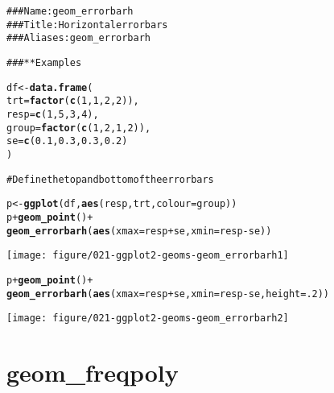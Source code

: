 \documentclass[a4paper,titlepage]{tufte-handout}\usepackage{graphicx, color}
\makeatletter
\def\maxwidth{ %
  \ifdim\Gin@nat@width>\linewidth
    \linewidth
  \else
    \Gin@nat@width
  \fi
}
\newcommand{\hlfunctioncall}[1]{\textcolor[rgb]{0.501960784313725,0,0.329411764705882}{\textbf{#1}}}%
\newcommand{\hlcomment}[1]{\textcolor[rgb]{0.180392156862745,0.6,0.341176470588235}{#1}}%
\newenvironment{kframe}{%
 \def\at@end@of@kframe{}%
 \ifinner\ifhmode%
  \def\at@end@of@kframe{\end{minipage}}%
  \begin{minipage}{\columnwidth}%
 \fi\fi%
 \def\FrameCommand##1{\hskip\@totalleftmargin \hskip-\fboxsep
 \colorbox{shadecolor}{##1}\hskip-\fboxsep
     \hskip-\linewidth \hskip-\@totalleftmargin \hskip\columnwidth}%
 \MakeFramed {\advance\hsize-\width
   \@totalleftmargin\z@ \linewidth\hsize
   \@setminipage}}%
 {\par\unskip\endMakeFramed%
 \at@end@of@kframe}
\newenvironment{knitrout}{}{} %
\makeatother
\begin{document}
\begin{knitrout}
\color{fgcolor}\begin{kframe}
\begin{alltt}
\hlcomment{### Name: geom_errorbarh}
\hlcomment{### Title: Horizontal error bars}
\hlcomment{### Aliases: geom_errorbarh}

\hlcomment{### ** Examples}

df <- \hlfunctioncall{data.frame}(
  trt = \hlfunctioncall{factor}(\hlfunctioncall{c}(1, 1, 2, 2)),
  resp = \hlfunctioncall{c}(1, 5, 3, 4),
  group = \hlfunctioncall{factor}(\hlfunctioncall{c}(1, 2, 1, 2)),
  se = \hlfunctioncall{c}(0.1, 0.3, 0.3, 0.2)
)

\hlcomment{# Define the top and bottom of the errorbars}

p <- \hlfunctioncall{ggplot}(df, \hlfunctioncall{aes}(resp, trt, colour = group))
p + \hlfunctioncall{geom_point}() +
  \hlfunctioncall{geom_errorbarh}(\hlfunctioncall{aes}(xmax = resp + se, xmin = resp - se))
\end{alltt}
\end{kframe}
\texttt{[image: figure/021-ggplot2-geoms-geom\_errorbarh1]} 
\begin{kframe}\begin{alltt}
p + \hlfunctioncall{geom_point}() +
  \hlfunctioncall{geom_errorbarh}(\hlfunctioncall{aes}(xmax = resp + se, xmin = resp - se, height = .2))
\end{alltt}
\end{kframe}
\texttt{[image: figure/021-ggplot2-geoms-geom\_errorbarh2]} 
\begin{kframe}\begin{alltt}


\end{alltt}
\end{kframe}
\end{knitrout}



\section{geom\_freqpoly}
\end{document}
